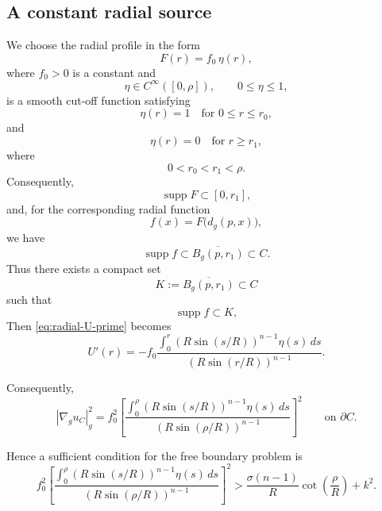 \documentclass{article}
\renewcommand{\boxed}[1]{#1}
\begin{document}
\subsection{A constant radial source}
\label{subsec:constant-source-sphere}

We choose the radial profile in the form
\[
F(r)=f_0\,\eta(r),
\]
where $f_0>0$ is a constant and
\[
\eta\in C^\infty([0,\rho]),
\qquad
0\leq\eta\leq1,
\]
is a smooth cut-off function satisfying
\[
\eta(r)=1
\quad\text{for }0\leq r\leq r_0,
\]
and
\[
\eta(r)=0
\quad\text{for }r\geq r_1,
\]
where
\[
0<r_0<r_1<\rho.
\]
Consequently,
\[
\operatorname{supp}F\subset[0,r_1],
\]
and, for the corresponding radial function
\[
f(x)=F\bigl(d_g(p,x)\bigr),
\]
we have
\[
\operatorname{supp}f
\subset\overline{B_g(p,r_1)}
\subset C.
\]
Thus there exists a compact set
\[
K:=\overline{B_g(p,r_1)}\subset C
\]
such that
\[
\operatorname{supp}f\subset K,
\]
Then \eqref{eq:radial-U-prime} becomes
\begin{equation}
U'(r)
=
-
f_0
\frac{
\displaystyle
\int_0^r
\left(R\sin(s/R)\right)^{n-1}\eta(s)\,ds
}{
\left(R\sin(r/R)\right)^{n-1}
}.
\label{eq:constant-source-Uprime}
\end{equation}

Consequently,
\begin{equation}
|\nabla_g u_C|_g^2
=
f_0^2
\left[
\frac{
\displaystyle
\int_0^\rho
\left(R\sin(s/R)\right)^{n-1}\eta(s)\,ds
}{
\left(R\sin(\rho/R)\right)^{n-1}
}
\right]^2
\qquad\text{on }\partial C.
\label{eq:constant-source-gradient}
\end{equation}

Hence a sufficient condition for the free boundary problem is
\begin{equation}
\boxed{
f_0^2
\left[
\frac{
\displaystyle
\int_0^\rho
\left(R\sin(s/R)\right)^{n-1}\eta(s)\,ds
}{
\left(R\sin(\rho/R)\right)^{n-1}
}
\right]^2
>
\frac{\sigma(n-1)}{R}
\cot\left(\frac{\rho}{R}\right)
+
k^2.
}
\label{eq:constant-source-condition}
\end{equation}

\end{document}
